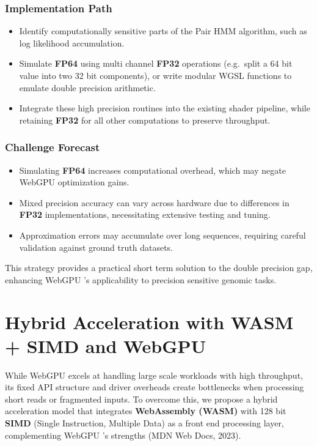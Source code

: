 \documentclass[PhD]{PHlab-thesis}
\begin{document}
\subsubsection*{Implementation Path}
\begin{itemize}
  \item Identify computationally sensitive parts of the Pair HMM algorithm, such as log likelihood accumulation.
  \item Simulate \textbf{FP64} using multi channel \textbf{FP32} operations (e.g.\ split a 64 bit value into two 32 bit components), or write modular WGSL functions to emulate double precision arithmetic.
  \item Integrate these high precision routines into the existing shader pipeline, while retaining \textbf{FP32} for all other computations to preserve throughput.
\end{itemize}

\subsubsection*{Challenge Forecast}
\begin{itemize}
  \item Simulating \textbf{FP64} increases computational overhead, which may negate WebGPU optimization gains.
  \item Mixed precision accuracy can vary across hardware due to differences in \textbf{FP32} implementations, necessitating extensive testing and tuning.
  \item Approximation errors may accumulate over long sequences, requiring careful validation against ground truth datasets.
\end{itemize}

This strategy provides a practical short term solution to the double precision gap, enhancing WebGPU 's applicability to precision sensitive genomic tasks.

\section{Hybrid Acceleration with WASM + SIMD and WebGPU}

While WebGPU excels at handling large scale workloads with high throughput, its fixed API structure and driver overheads create bottlenecks when processing short reads or fragmented inputs. To overcome this, we propose a hybrid acceleration model that integrates \textbf{WebAssembly (WASM)} with 128 bit \textbf{SIMD} (Single Instruction, Multiple Data) as a front end processing layer, complementing WebGPU 's strengths (MDN Web Docs, 2023).
\end{document}
